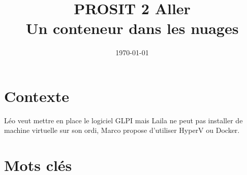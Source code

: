 \documentclass{article}
\title{%
  PROSIT 2 Aller \\
  \large  Un conteneur dans les nuages}
\date{\today}
\begin{document}
\maketitle

\tableofcontents

\pagebreak

\section{Contexte}
Léo veut mettre en place le logiciel GLPI mais Laila ne peut pas installer de machine virtuelle sur son ordi, Marco propose d'utiliser HyperV ou Docker.

\section{Mots clés}
\end{document}
